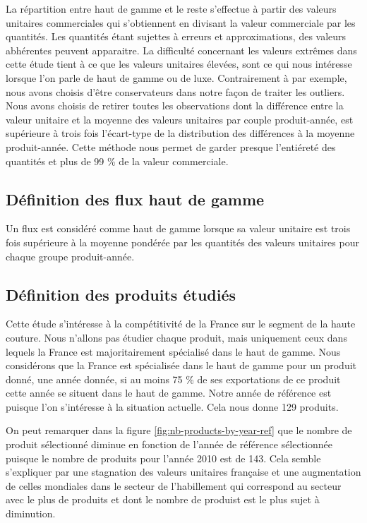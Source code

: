 \documentclass[french,10pt,a4paper]{article}
\begin{document}
La répartition entre haut de gamme et le reste s'effectue à partir des valeurs unitaires commerciales qui s'obtiennent en divisant la valeur commerciale par les quantités. Les quantités étant sujettes à erreurs et approximations, des valeurs abhérentes peuvent apparaitre. La difficulté concernant les valeurs extrêmes dans cette étude tient à ce que les valeurs unitaires élevées, sont ce qui nous intéresse lorsque l'on parle de haut de gamme ou de luxe. Contrairement à \cite{Fontagne2013} par exemple, nous avons choisis d'être conservateurs dans notre façon de traiter les outliers. Nous avons choisis de retirer toutes les observations dont la différence entre la valeur unitaire et la moyenne des valeurs unitaires par couple produit-année, est supérieure à trois fois l'écart-type de la distribution des différences à la moyenne produit-année. Cette méthode nous permet de garder presque l'entiéreté des quantités et plus de 99 \% de la valeur commerciale.


\subsection{Définition des flux haut de gamme}

Un flux est considéré comme haut de gamme lorsque sa valeur unitaire est trois fois supérieure à la moyenne pondérée par les quantités des valeurs unitaires pour chaque groupe produit-année.

\subsection{Définition des produits étudiés}

Cette étude s'intéresse à la compétitivité de la France sur le segment de la haute couture. Nous n'allons pas étudier chaque produit, mais uniquement ceux dans lequels la France est majoritairement spécialisé dans le haut de gamme. Nous considérons que la France est spécialisée dans le haut de gamme pour un produit donné, une année donnée, si au moins 75 \% de ses exportations de ce produit cette année se situent dans le haut de gamme. Notre année de référence est  puisque l'on s'intéresse à la situation actuelle. Cela nous donne 129 produits.

On peut remarquer dans la figure \ref{fig:nb-products-by-year-ref} que le nombre de produit sélectionné diminue en fonction de l'année de référence sélectionnée puisque le nombre de produits pour l'année 2010 est de 143. Cela semble s'expliquer par une stagnation des valeurs unitaires française et une augmentation de celles mondiales dans le secteur de l'habillement qui correspond au secteur avec le plus de produits et dont le nombre de produist est le plus sujet à diminution.
\end{document}
